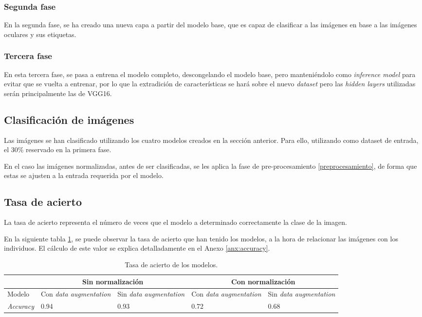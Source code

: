 \subsubsection{Segunda fase}

En la segunda fase, se ha creado una nueva capa a partir del modelo base, que es capaz de clasificar a las imágenes en base a las imágenes oculares y sus etiquetas. 

\subsubsection{Tercera fase}

En esta tercera fase, se pasa a entrena el modelo completo, descongelando el modelo base, pero manteniéndolo como \textit{inference model} para evitar que se vuelta a entrenar, por lo que la extradición de características se hará sobre el nuevo \textit{dataset} pero las \textit{hidden layers} utilizadas serán principalmente las de VGG16.

\subsection{Clasificación de imágenes}

Las imágenes se han clasificado utilizando los cuatro modelos creados en la sección anterior. Para ello, utilizando como dataset de entrada, el 30\% reservado en la primera fase.

En el caso las imágenes normalizadas, antes de ser clasificadas, se les aplica la fase de pre-procesamiento \ref{preprocesamiento}, de forma que estas se ajusten a la entrada requerida por el modelo.

\subsection{Tasa de acierto} 

La tasa de acierto representa el número de veces que el modelo a determinado correctamente la clase de la imagen. 

En la siguiente tabla \ref{tabla:tasa-acierto-modelos}, se puede observar la tasa de acierto que han tenido los modelos, a la hora de relacionar las imágenes
 con los individuos. El cálculo de este valor se explica detalladamente en el Anexo \ref{anx:accuracy}.

\begin{table}[h!]
\begin{tabular}{ |p{2cm}||p{2cm}|p{2cm}|p{2cm}|p{2cm}|  }
    \hline
     & \multicolumn{2}{|c|}{Sin normalización} & \multicolumn{2}{|c|}{Con normalización} \\
    \hline
    Modelo& Con \textit{data augmentation} & Sin \textit{data augmentation} &Con \textit{data augmentation}&Sin \textit{data augmentation}\\
    \hline
    \textit{Accuracy} & 0.94   & 0.93    & 0.72 &   0.68\\
    \hline
   \end{tabular}
   \caption{\label{tabla:tasa-acierto-modelos}Tasa de acierto de los modelos.}
\end{table}


